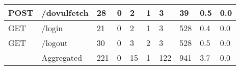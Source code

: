 \begin{table*}[h]
\begin{tabular}{|l|l|l|l|l|l|l|l|l|l|}
  POST                                  & /dovulfetch                        & 28                                        & 0                                      & 2                                          & 1                                      & 3                                      & 39                                                 & 0.5                               & 0.0                                      \\ \hline
  GET                                   & /login                             & 21                                        & 0                                      & 2                                          & 1                                      & 3                                      & 528                                                & 0.4                               & 0.0                                      \\ \hline
  GET                                   & /logout                            & 30                                        & 0                                      & 3                                          & 2                                      & 3                                      & 528                                                & 0.5                               & 0.0                                      \\ \hline
                                        & Aggregated                         & 221                                       & 0                                      & 15                                         & 1                                      & 122                                    & 941                                                & 3.7                               & 0.0                                      \\ \hline
  \end{tabular}
  \end{table*}